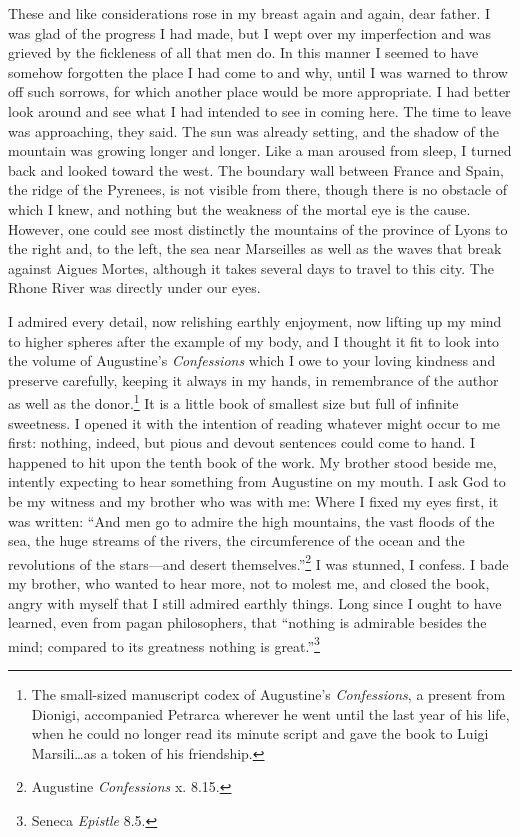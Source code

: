 These and like considerations rose in my breast again and again, dear
father. I was glad of the progress I had made, but I wept over my
imperfection and was grieved by the fickleness of all that men do. In
this manner I seemed to have somehow forgotten the place I had come to
and why, until I was warned to throw off such sorrows, for which
another place would be more appropriate. I had better look around and
see what I had intended to see in coming here. The time to leave was
approaching, they said. The sun was already setting, and the shadow of
the mountain was growing longer and longer. Like a man aroused from
sleep, I turned back and looked toward the west. The boundary wall
between France and Spain, the ridge of the Pyrenees, is not visible
from there, though there is no obstacle of which I knew, and nothing
but the weakness of the mortal eye is the cause. However, one could
see most distinctly the mountains of the province of Lyons to the
right and, to the  left, the sea near Marseilles as well as
the waves that break against Aigues Mortes, although it takes several
days to travel to this city. The Rhone River was directly under our
eyes.

I admired every detail, now relishing earthly enjoyment, now lifting
up my mind to higher spheres after the example of my body, and I
thought it fit to look into the volume of Augustine's
\textit{Confessions} which I owe to your loving kindness and preserve
carefully, keeping it always in my hands, in remembrance of the author
as well as the donor.\footnote{The small-sized manuscript codex of
Augustine's \textit{Confessions}, a present from Dionigi, accompanied
Petrarca wherever he went until the last year of his life, when he
could no longer read its minute script and gave the book to Luigi
Marsili\ldots as a token of his friendship.} It is a little book of
smallest size but full of infinite sweetness. I opened it with the
intention of reading whatever might occur to me first: nothing,
indeed, but pious and devout sentences could come to hand. I happened
to hit upon the tenth book of the work. My brother stood beside me,
intently expecting to hear something from Augustine on my mouth. I ask
God to be my witness and my brother who was with me: Where I fixed my
eyes first, it was written: ``And men go to admire the high mountains,
the vast floods of the sea, the huge streams of the rivers, the
circumference of the ocean and the revolutions of the stars---and
desert themselves.''\footnote{Augustine \textit{Confessions} x. 8.15.}
I was stunned, I confess. I bade my brother, who wanted to hear more,
not to molest me, and closed the book, angry with myself that I still
admired earthly things. Long since I ought to have learned, even
from pagan philosophers, that ``nothing is admirable besides the mind;
compared to its greatness nothing is great.''\footnote{Seneca
\textit{Epistle} 8.5.}

